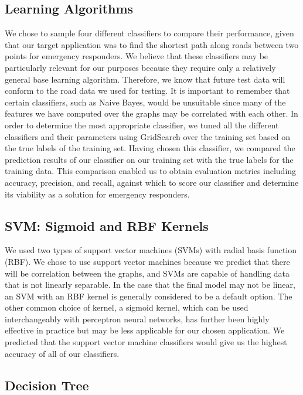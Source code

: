\documentclass{article}
\begin{document}
\subsection{Learning Algorithms}

We  chose to sample four different classifiers to compare their performance, given that our target application was to find the shortest path along roads between two points for emergency responders. We believe that these classifiers may be particularly relevant for our purposes because they require only a relatively general base learning algorithm. Therefore, we know that future test data will conform to the road data we used for testing. It is important to remember that certain classifiers, such as Naive Bayes, would be unsuitable since many of the features we have computed over the graphs may be correlated with each other. In order to determine the most appropriate classifier, we tuned all the different classifiers and their parameters using GridSearch over the training set based on the true labels of the training set. Having chosen this classifier, we compared the prediction results of our classifier on our training set with the true labels for the training data. This comparison enabled us to obtain evaluation metrics including accuracy, precision, and recall, against which to score our classifier and determine its viability as a solution for emergency responders.

\subsection{SVM: Sigmoid and RBF Kernels}

We used two types of support vector machines (SVMs) with radial basis function (RBF). We chose to use support vector machines because we predict that there will be correlation between the graphs, and SVMs are capable of handling data that is not linearly separable. In the case that the final model may not be linear, an SVM with an RBF kernel is generally considered to be a default option. The other common choice of kernel, a sigmoid kernel, which can be used interchangeably with perceptron neural networks, has further been highly effective in practice but may be less applicable for our chosen application. We predicted that the support vector machine classifiers would give us the highest accuracy of all of our classifiers.

\subsection{Decision Tree}
\end{document}
